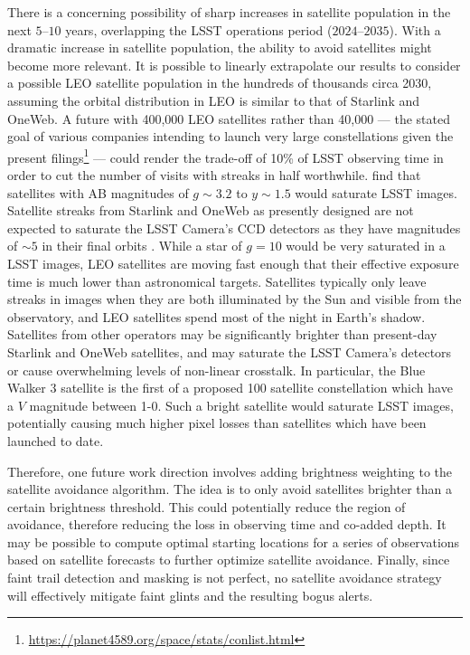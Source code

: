 \documentclass[twocolumn]{aastex631}
\begin{document}
There is a concerning possibility of sharp increases in satellite population in the next $5–10$ years, overlapping the LSST operations period ($2024–2035$). With a dramatic increase in satellite population, the ability to avoid satellites might become more relevant. 
It is possible to linearly extrapolate our results to consider a possible LEO satellite population in the hundreds of thousands circa 2030, assuming the orbital distribution in LEO is similar to that of Starlink and OneWeb. A future with 400,000 LEO satellites rather than 40,000 --- the stated goal of various companies intending to launch very large constellations given the present filings\footnote{\url{https://planet4589.org/space/stats/conlist.html}} --- could render the trade-off of 10\% of LSST observing time in order to cut the number of visits with streaks in half worthwhile. 
\citet{tyson20} find that satellites with AB magnitudes of $g \sim 3.2$ to $y \sim 1.5$ would saturate LSST images. 
Satellite streaks from Starlink and OneWeb as presently designed are not expected to saturate the LSST Camera's CCD detectors as they have magnitudes of $\sim5$ in their final orbits \citep{Halferty2022}. While a star of $g=10$ would be very saturated in a LSST images, LEO satellites are moving fast enough that their effective exposure time is much lower than astronomical targets. Satellites typically only leave streaks in images when they are both illuminated by the Sun and visible from the observatory, and LEO satellites spend most of the night in Earth's shadow.
Satellites from other operators may be significantly brighter than present-day Starlink and OneWeb satellites, and may saturate the LSST Camera’s detectors or cause overwhelming levels of non-linear crosstalk. In particular, the Blue Walker 3 satellite is the first of a proposed 100 satellite constellation which have a $V$ magnitude between 1-0. Such a bright satellite would saturate LSST images, potentially causing much higher pixel losses than satellites which have been launched to date.
 
Therefore, one future work direction involves adding brightness weighting to the satellite avoidance algorithm. The idea is to only avoid satellites brighter than a certain brightness threshold. This could potentially reduce the region of avoidance, therefore reducing the loss in observing time and co-added depth. It may be possible to compute optimal starting locations for a series of observations based on satellite forecasts to further optimize satellite avoidance. Finally, since faint trail detection and masking is not perfect, no satellite avoidance strategy will effectively mitigate faint glints and the resulting bogus alerts.
\end{document}
